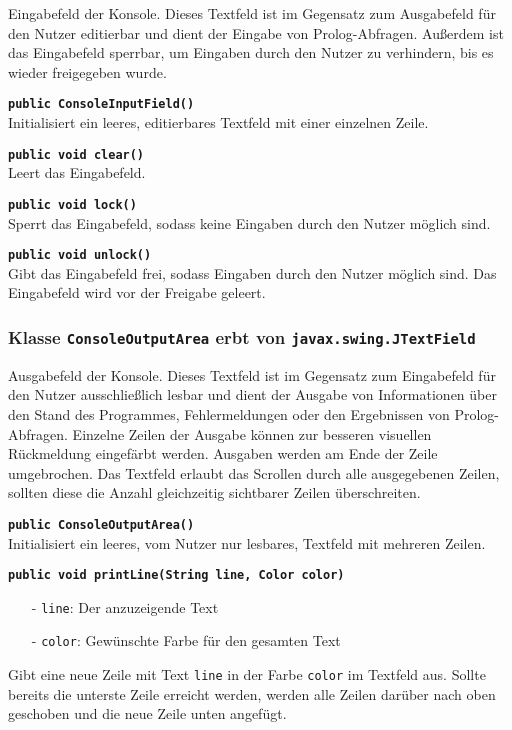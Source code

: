 \documentclass[parskip=full,11pt,twoside]{scrartcl}
\begin{document}
Eingabefeld der Konsole. Dieses Textfeld ist im Gegensatz zum Ausgabefeld für den Nutzer editierbar und dient der Eingabe von Prolog-Abfragen. Außerdem ist das Eingabefeld sperrbar, um Eingaben durch den Nutzer zu verhindern, bis es wieder freigegeben wurde.

\textbf{\texttt{public ConsoleInputField()}}\\
Initialisiert ein leeres, editierbares Textfeld mit einer einzelnen Zeile.

\textbf{\texttt{public void clear()}}\\
Leert das Eingabefeld.

\textbf{\texttt{public void lock()}}\\
Sperrt das Eingabefeld, sodass keine Eingaben durch den Nutzer möglich sind.

\textbf{\texttt{public void unlock()}}\\
Gibt das Eingabefeld frei, sodass Eingaben durch den Nutzer möglich sind. Das Eingabefeld wird vor der Freigabe geleert.

\subsubsection{Klasse \texttt{ConsoleOutputArea} erbt von \texttt{javax.swing.JTextField}}

Ausgabefeld der Konsole. Dieses Textfeld ist im Gegensatz zum Eingabefeld für den Nutzer ausschließlich lesbar und dient der Ausgabe von Informationen über den Stand des Programmes, Fehlermeldungen oder den Ergebnissen von Prolog-Abfragen. Einzelne Zeilen der Ausgabe können zur besseren visuellen Rückmeldung eingefärbt werden. Ausgaben werden am Ende der Zeile umgebrochen. Das Textfeld erlaubt das Scrollen durch alle ausgegebenen Zeilen, sollten diese die Anzahl gleichzeitig sichtbarer Zeilen überschreiten.

\textbf{\texttt{public ConsoleOutputArea()}}\\
Initialisiert ein leeres, vom Nutzer nur lesbares, Textfeld mit mehreren Zeilen.

\textbf{\texttt{public void printLine(String line, Color color)}}
\begin{itemize}[noitemsep]
	\item[-] \texttt{line}: Der anzuzeigende Text
	\item[-] \texttt{color}: Gewünschte Farbe für den gesamten Text
\end{itemize}
Gibt eine neue Zeile mit Text \texttt{line} in der Farbe \texttt{color} im Textfeld aus. Sollte bereits die unterste Zeile erreicht werden, werden alle Zeilen darüber nach oben geschoben und die neue Zeile unten angefügt.
\end{document}
